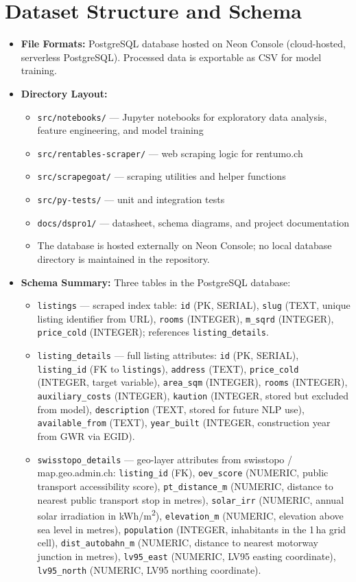 \documentclass[11pt, a4paper]{article}
\begin{document}
\section{Dataset Structure and Schema}
\begin{itemize}
    \item \textbf{File Formats:} PostgreSQL database hosted on Neon Console (cloud-hosted, serverless PostgreSQL). Processed data is exportable as CSV for model training.
    \item \textbf{Directory Layout:}
    \begin{itemize}
        \item \texttt{src/notebooks/} --- Jupyter notebooks for exploratory data analysis, feature engineering, and model training
        \item \texttt{src/rentables-scraper/} --- web scraping logic for rentumo.ch
        \item \texttt{src/scrapegoat/} --- scraping utilities and helper functions
        \item \texttt{src/py-tests/} --- unit and integration tests
        \item \texttt{docs/dspro1/} --- datasheet, schema diagrams, and project documentation
        \item The database is hosted externally on Neon Console; no local database directory is maintained in the repository.
    \end{itemize}
    \item \textbf{Schema Summary:} Three tables in the PostgreSQL database:
    \begin{itemize}
        \item \texttt{listings} --- scraped index table: \texttt{id} (PK, SERIAL), \texttt{slug} (TEXT, unique listing identifier from URL), \texttt{rooms} (INTEGER), \texttt{m\_sqrd} (INTEGER), \texttt{price\_cold} (INTEGER); references \texttt{listing\_details}.
        \item \texttt{listing\_details} --- full listing attributes: \texttt{id} (PK, SERIAL), \texttt{listing\_id} (FK to \texttt{listings}), \texttt{address} (TEXT), \texttt{price\_cold} (INTEGER, target variable), \texttt{area\_sqm} (INTEGER), \texttt{rooms} (INTEGER), \texttt{auxiliary\_costs} (INTEGER), \texttt{kaution} (INTEGER, stored but excluded from model), \texttt{description} (TEXT, stored for future NLP use), \texttt{available\_from} (TEXT), \texttt{year\_built} (INTEGER, construction year from GWR via EGID).
        \item \texttt{swisstopo\_details} --- geo-layer attributes from swisstopo / map.geo.admin.ch: \texttt{listing\_id} (FK), \texttt{oev\_score} (NUMERIC, public transport accessibility score), \texttt{pt\_distance\_m} (NUMERIC, distance to nearest public transport stop in metres), \texttt{solar\_irr} (NUMERIC, annual solar irradiation in kWh/m\textsuperscript{2}), \texttt{elevation\_m} (NUMERIC, elevation above sea level in metres), \texttt{population} (INTEGER, inhabitants in the 1\,ha grid cell), \texttt{dist\_autobahn\_m} (NUMERIC, distance to nearest motorway junction in metres), \texttt{lv95\_east} (NUMERIC, LV95 easting coordinate), \texttt{lv95\_north} (NUMERIC, LV95 northing coordinate).

\end{itemize}
\end{itemize}
\end{document}
